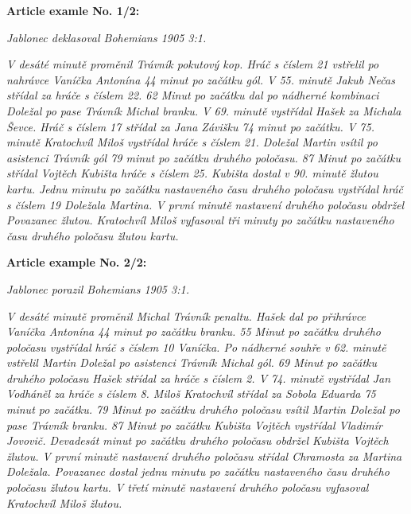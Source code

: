 \noindent\makebox[\linewidth]{\rule{\textwidth}{0.4pt}}
\textbf{Article examle No. 1/2:}
\begin{center}
\textit{Jablonec deklasoval Bohemians 1905 3:1.  }
\end{center}

\textit{V desáté minutě proměnil Trávník pokutový kop. Hráč s číslem 21 vstřelil po nahrávce Vaníčka Antonína 44 minut po začátku gól. V 55. minutě Jakub Nečas střídal za hráče s číslem 22. 62 Minut po začátku dal po nádherné kombinaci Doležal po pase Trávník Michal branku. V 69. minutě vystřídal Hašek za Michala Ševce. Hráč s číslem 17 střídal za Jana Závišku 74 minut po začátku. V 75. minutě Kratochvíl Miloš vystřídal hráče s číslem 21. Doležal Martin vsítil po asistenci Trávník gól 79 minut po začátku druhého poločasu. 87 Minut po začátku střídal Vojtěch Kubišta hráče s číslem 25. Kubišta dostal v 90. minutě žlutou kartu. Jednu minutu po začátku nastaveného času druhého poločasu vystřídal hráč s číslem 19 Doležala Martina. V první minutě nastavení druhého poločasu obdržel Povazanec žlutou. Kratochvíl Miloš vyfasoval tři minuty po začátku nastaveného času druhého poločasu žlutou kartu.}

\noindent\makebox[\linewidth]{\rule{\textwidth}{0.4pt}}
\textbf{Article example No. 2/2:}
\begin{center}
\textit{Jablonec porazil Bohemians 1905 3:1.}
\end{center}                                      

\textit{V desáté minutě proměnil Michal Trávník penaltu. Hašek dal po přihrávce Vaníčka Antonína 44 minut po začátku branku. 55 Minut po začátku druhého poločasu vystřídal hráč s číslem 10 Vaníčka. Po nádherné souhře v 62. minutě vstřelil Martin Doležal po asistenci Trávník Michal gól. 69 Minut po začátku druhého poločasu Hašek střídal za hráče s číslem 2. V 74. minutě vystřídal Jan Vodháněl za hráče s číslem 8. Miloš Kratochvíl střídal za Sobola Eduarda 75 minut po začátku. 79 Minut po začátku druhého poločasu vsítil Martin Doležal po pase Trávník branku. 87 Minut po začátku Kubišta Vojtěch vystřídal Vladimír Jovovič. Devadesát minut po začátku druhého poločasu obdržel Kubišta Vojtěch žlutou. V první minutě nastavení druhého poločasu střídal Chramosta za Martina Doležala. Povazanec dostal jednu minutu po začátku nastaveného času druhého poločasu žlutou kartu. V třetí minutě nastavení druhého poločasu vyfasoval Kratochvíl Miloš žlutou.}

\noindent\makebox[\linewidth]{\rule{\textwidth}{0.4pt}}

